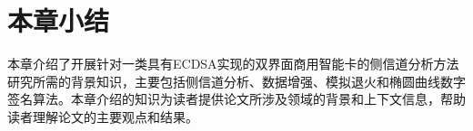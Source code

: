 {%
%	
%	
%	
%	
	\section{本章小结}
	本章介绍了开展针对一类具有ECDSA实现的双界面商用智能卡的侧信道分析方法研究所需的背景知识，主要包括侧信道分析、数据增强、模拟退火和椭圆曲线数字签名算法。本章介绍的知识为读者提供论文所涉及领域的背景和上下文信息，帮助读者理解论文的主要观点和结果。
}